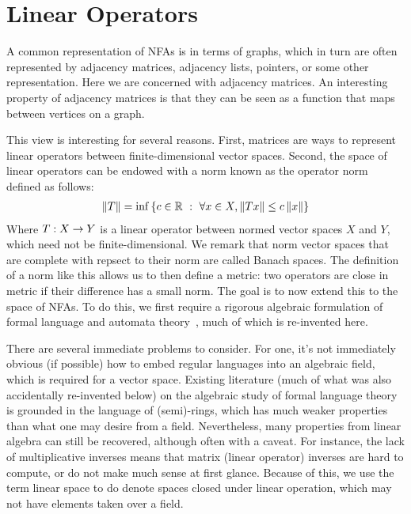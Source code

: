 
\section{Linear Operators}

A common representation of NFAs is in terms of graphs,
which in turn are often represented by adjacency matrices,
adjacency lists, pointers, or some other representation.
Here we are concerned with adjacency matrices.
An interesting property of adjacency matrices is that they can be seen
as a function that maps between vertices on a graph.

This view is interesting for several reasons.
First, matrices are ways to represent linear operators
between finite-dimensional vector spaces.
Second, the space of linear operators can be endowed with a norm
known as the operator norm defined as follows:
\begin{align*}
  \left\lVert T\right\rVert
    = \inf\left\{c \in \mathbb{R} \  : \ 
              \forall x \in X, \left\lVert Tx\right\rVert \leq c \left\lVert x\right\rVert\right\}
\end{align*}
Where \(T : X \to Y\) is a linear operator between
normed vector spaces \(X\) and \(Y\), which need not be finite-dimensional.
We remark that norm vector spaces that are complete with repsect to their
norm are called Banach spaces.
The definition of a norm like this allows us to then define a metric:
two operators are close in metric if their difference has a small norm.
The goal is to now extend this to the space of NFAs.
To do this, we first require a rigorous algebraic formulation of
formal language and automata theory~\cite{pin2010mathematical,kozen1994kleene},
much of which is re-invented here.

There are several immediate problems to consider.
For one, it's not immediately obvious (if possible) how to embed
regular languages into an algebraic field,
which is required for a vector space.
Existing literature (much of what was also accidentally re-invented below)
on the algebraic study of formal language theory is grounded
in the language of (semi)-rings,
which has much weaker properties than what one may desire from a field.
Nevertheless, many properties from linear algebra can still be recovered,
although often with a caveat.
For instance, the lack of multiplicative inverses means that
matrix (linear operator) inverses are hard to compute,
or do not make much sense at first glance.
Because of this, we use the term linear space to do denote spaces
closed under linear operation, which may not have elements taken
over a field.

